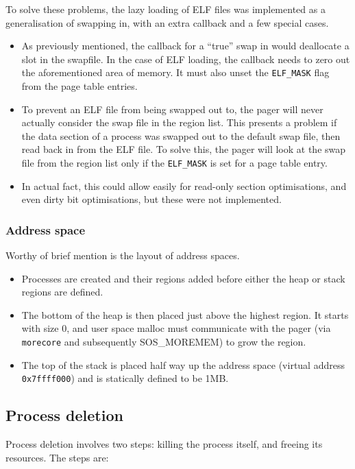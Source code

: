 \documentclass[12pt,english]{article}
\begin{document}
To solve these problems, the lazy loading of ELF files was implemented as a generalisation of swapping in, with an extra callback and a few special cases.
\begin{itemize}
\item As previously mentioned, the callback for a ``true'' swap in would deallocate a slot in the swapfile.  In the case of ELF loading, the callback needs to zero out the aforementioned area of memory.  It must also unset the \texttt{ELF\_MASK} flag from the page table entries.
\item To prevent an ELF file from being swapped out to, the pager will never actually consider the swap file in the region list.  This presents a problem if the data section of a process was swapped out to the default swap file, then read back in from the ELF file.  To solve this, the pager will look at the swap file from the region list only if the \texttt{ELF\_MASK} is set for a page table entry.
\item In actual fact, this could allow easily for read-only section optimisations, and even dirty bit optimisations, but these were not implemented.
\end{itemize}

\subsubsection{Address space}

Worthy of brief mention is the layout of address spaces.
\begin{itemize}
\item Processes are created and their regions added before either the heap or stack regions are defined.
\item The bottom of the heap is then placed just above the highest region.  It starts with size 0, and user space malloc must communicate with the pager (via \texttt{morecore} and subsequently SOS\_MOREMEM) to grow the region.
\item The top of the stack is placed half way up the address space (virtual address \texttt{0x7ffff000}) and is statically defined to be 1MB.
\end{itemize}

\subsection{Process deletion} \label{sub:process_delete}

Process deletion involves two steps: killing the process itself, and freeing its resources.  The steps are:
\end{document}
